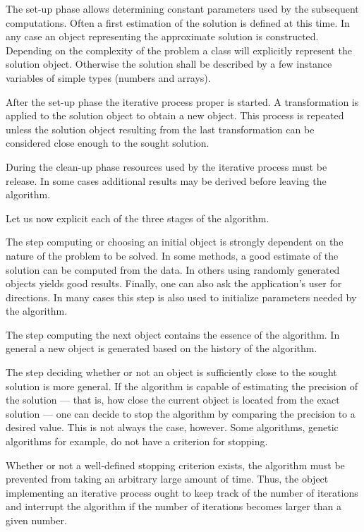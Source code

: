 \documentclass[twoside]{book}
\begin{document}
The set-up phase allows determining constant parameters used by
the subsequent computations. Often a first estimation of the
solution is defined at this time. In any case an object
representing the approximate solution is constructed. Depending on
the complexity of the problem a class will explicitly represent
the solution object. Otherwise the solution shall be described by
a few instance variables of simple types (numbers and arrays).

After the set-up phase the iterative process proper is started. A
transformation is applied to the solution object to obtain a new
object. This process is repeated unless the solution object
resulting from the last transformation can be considered close
enough to the sought solution.

During the clean-up phase resources used by the iterative process
must be release. In some cases additional results may be derived
before leaving the algorithm.

\noindent Let us now explicit each of the three stages of the
algorithm.

The step computing or choosing an initial object is strongly
dependent on the nature of the problem to be solved. In some
methods, a good estimate of the solution can be computed from the
data. In others using randomly generated objects yields good
results. Finally, one can also ask the application's user for
directions. In many cases this step is also used to initialize
parameters needed by the algorithm.

The step computing the next object contains the essence of the
algorithm. In general a new object is generated based on the
history of the algorithm.

The step deciding whether or not an object is sufficiently close
to the sought solution is more general. If the algorithm is
capable of estimating the precision of the solution --- that is,
how close the current object is located from the exact solution
--- one can decide to stop the algorithm by comparing the
precision to a desired value. This is not always the case,
however. Some algorithms, genetic algorithms for example, do not
have a criterion for stopping.

Whether or not a well-defined stopping criterion exists, the
algorithm must be prevented from taking an arbitrary large amount
of time. Thus, the object implementing an iterative process ought
to keep track of the number of iterations and interrupt the
algorithm if the number of iterations becomes larger than a given
number.
\end{document}
